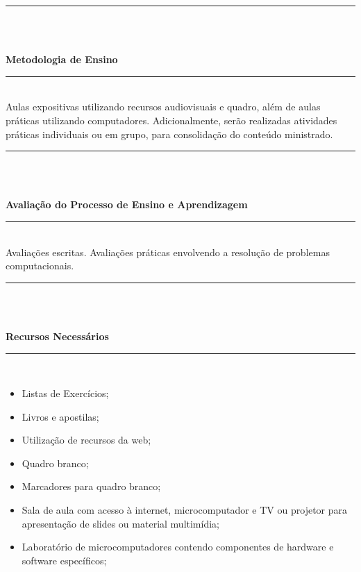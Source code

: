 \noindent\rule{16.5cm}{0.4pt}\\
\\
\vspace{-12mm}
\begin{center}\textbf{Metodologia de Ensino}\end{center} 
\vspace{-5mm}
\noindent\rule{16.5cm}{0.4pt}
\\
   Aulas expositivas utilizando recursos audiovisuais e quadro, além de aulas práticas utilizando computadores. Adicionalmente, serão realizadas atividades práticas individuais ou em grupo, para consolidação do conteúdo ministrado.\\
\noindent\rule{16.5cm}{0.4pt}\\
\\
\vspace{-12mm}
\begin{center}\textbf{Avaliação do Processo de Ensino e Aprendizagem}\end{center}
\vspace{-5mm}
\noindent\rule{16.5cm}{0.4pt}
\\
   Avaliações escritas. Avalia\c{c}\~oes pr\'aticas envolvendo a resolu\c{c}\~ao de problemas computacionais.\\
\noindent\rule{16.5cm}{0.4pt}\\
\\
\vspace{-12mm}
\begin{center}\textbf{Recursos Necessários}\end{center}
\vspace{-5mm}
\noindent\rule{16.5cm}{0.4pt}
\\
\begin{itemize} 
  \item Listas de Exercícios;
  \item Livros e apostilas;
  \item Utilização de recursos da web;
  \item Quadro branco;
  \item Marcadores para quadro branco;
  \item Sala de aula com acesso à internet, microcomputador e TV ou projetor para apresentação de slides ou material multimídia;
  \item Laboratório de microcomputadores contendo componentes de hardware e software específicos;
\end{itemize}
